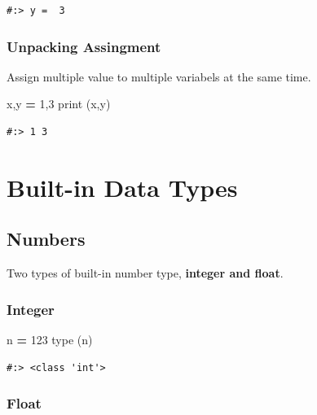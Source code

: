 \documentclass[
]{book}
\newenvironment{Shaded}{\begin{snugshade}}{\end{snugshade}}
\newcommand{\BuiltInTok}[1]{#1}
\newcommand{\DecValTok}[1]{\textcolor[rgb]{0.06,0.06,0.06}{#1}}
\newcommand{\NormalTok}[1]{#1}
\newcommand{\OperatorTok}[1]{\textcolor[rgb]{0.43,0.43,0.43}{\textbf{#1}}}
\begin{document}
\begin{verbatim}
#:> y =  3
\end{verbatim}

\hypertarget{unpacking-assingment}{%
\subsection{Unpacking Assingment}\label{unpacking-assingment}}

Assign multiple value to multiple variabels at the same time.

\begin{Shaded}
\begin{Highlighting}[]
\NormalTok{x,y }\OperatorTok{=} \DecValTok{1}\NormalTok{,}\DecValTok{3}
\BuiltInTok{print}\NormalTok{ (x,y)}
\end{Highlighting}
\end{Shaded}

\begin{verbatim}
#:> 1 3
\end{verbatim}

\hypertarget{built-in-data-types}{%
\chapter{Built-in Data Types}\label{built-in-data-types}}

\hypertarget{numbers}{%
\section{Numbers}\label{numbers}}

Two types of built-in number type, \textbf{integer and float}.

\hypertarget{integer}{%
\subsection{Integer}\label{integer}}

\begin{Shaded}
\begin{Highlighting}[]
\NormalTok{n }\OperatorTok{=} \DecValTok{123}
\BuiltInTok{type}\NormalTok{ (n)}
\end{Highlighting}
\end{Shaded}

\begin{verbatim}
#:> <class 'int'>
\end{verbatim}

\hypertarget{float}{%
\subsection{Float}\label{float}}
\end{document}
